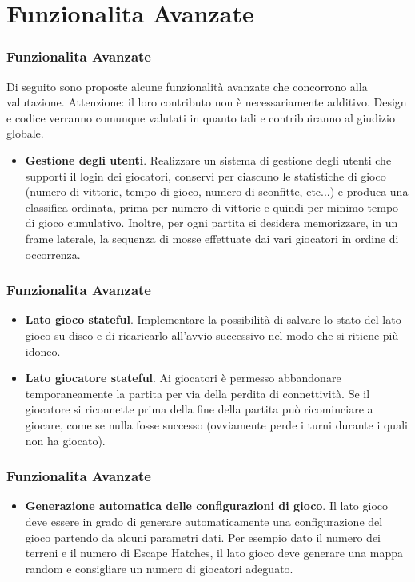 \documentclass{beamer}
\begin{document}
\section{Funzionalita Avanzate}
\begin{frame}
\frametitle{Funzionalita Avanzate}

Di seguito sono proposte alcune funzionalit\`a avanzate che concorrono alla valutazione.  Attenzione: il loro contributo non \`e  necessariamente additivo. Design e codice verranno comunque valutati in quanto tali e contribuiranno al giudizio globale.

\begin{itemize}
\item \textbf{Gestione degli utenti}. Realizzare un sistema di
  gestione degli utenti che supporti il login dei giocatori, conservi
  per ciascuno le statistiche di gioco (numero di vittorie, tempo di
  gioco, numero di sconfitte, etc...) e produca una classifica
  ordinata, prima per numero di vittorie e quindi per minimo tempo di
  gioco cumulativo. Inoltre, per ogni partita si desidera
  memorizzare, in un frame laterale, la sequenza di mosse effettuate dai
  vari giocatori in ordine di occorrenza.
\end{itemize}
\end{frame}

\begin{frame}
\frametitle{Funzionalita Avanzate}
\begin{itemize}
\item  \textbf{Lato gioco stateful}. Implementare la possibilit\`a di
  salvare lo stato del lato gioco su disco e di ricaricarlo all'avvio
  successivo nel modo che si ritiene pi\`u idoneo. 
\item  \textbf{Lato giocatore stateful}. Ai giocatori \`e permesso abbandonare
  temporaneamente la partita per via della perdita di connettivit\`a.
  Se il giocatore si riconnette prima della fine della partita pu\`o
  ricominciare a giocare, come se nulla fosse successo (ovviamente
  perde i turni durante i quali non ha giocato).
\end{itemize}

\end{frame}

\begin{frame}
\frametitle{Funzionalita Avanzate}
\begin{itemize}
\item \textbf{Generazione automatica delle configurazioni di
    gioco}. Il lato gioco deve essere in grado di generare automaticamente
  una configurazione del gioco partendo da alcuni parametri dati. Per
  esempio dato il numero dei terreni e il numero di Escape Hatches, il
  lato gioco deve generare una mappa random e consigliare un numero di
  giocatori adeguato.
\end{itemize}

\end{frame}
\end{document}
